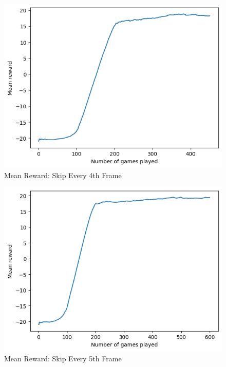 \documentclass[12pt, a4paper, twocolumn]{article} %
\begin{document}
\begin{figure}[H]
	\includegraphics[width=\linewidth]{mr_sk4.PNG} %
	\caption{Mean Reward: Skip Every 4th Frame} %
\end{figure}

\begin{figure}[H]
	\includegraphics[width=\linewidth]{mr_sk5.PNG} %
	\caption{Mean Reward: Skip Every 5th Frame} %
\end{figure}
\end{document}
